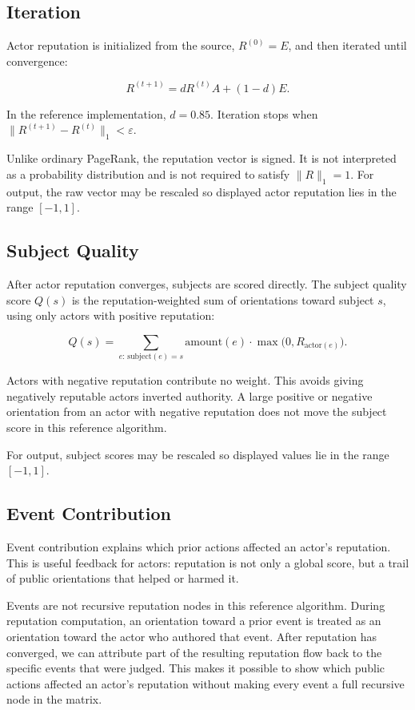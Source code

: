 \documentclass[11pt]{article}
\begin{document}
\subsection{Iteration}

Actor reputation is initialized from the source, \(R^{(0)} = E\), and then iterated until convergence:

\[
R^{(t+1)} = dR^{(t)}A + (1-d)E.
\]

In the reference implementation, \(d = 0.85\). Iteration stops when \(\|R^{(t+1)} - R^{(t)}\|_1 < \varepsilon\).

Unlike ordinary PageRank, the reputation vector is signed. It is not interpreted as a probability distribution and is not required to satisfy \(\|R\|_1 = 1\). For output, the raw vector may be rescaled so displayed actor reputation lies in the range \([-1,1]\).

\subsection{Subject Quality}

After actor reputation converges, subjects are scored directly. The subject quality score \(Q(s)\) is the reputation-weighted sum of orientations toward subject \(s\), using only actors with positive reputation:

\[
Q(s)
=
\sum_{e:\,\mathrm{subject}(e)=s}
\mathrm{amount}(e)\cdot
\max\!\bigl(0,R_{\mathrm{actor}(e)}\bigr).
\]

Actors with negative reputation contribute no weight. This avoids giving negatively reputable actors inverted authority. A large positive or negative orientation from an actor with negative reputation does not move the subject score in this reference algorithm.

For output, subject scores may be rescaled so displayed values lie in the range \([-1,1]\).

\subsection{Event Contribution}

Event contribution explains which prior actions affected an actor's reputation. This is useful feedback for actors: reputation is not only a global score, but a trail of public orientations that helped or harmed it.

Events are not recursive reputation nodes in this reference algorithm. During reputation computation, an orientation toward a prior event is treated as an orientation toward the actor who authored that event. After reputation has converged, we can attribute part of the resulting reputation flow back to the specific events that were judged. This makes it possible to show which public actions affected an actor's reputation without making every event a full recursive node in the matrix.
\end{document}

